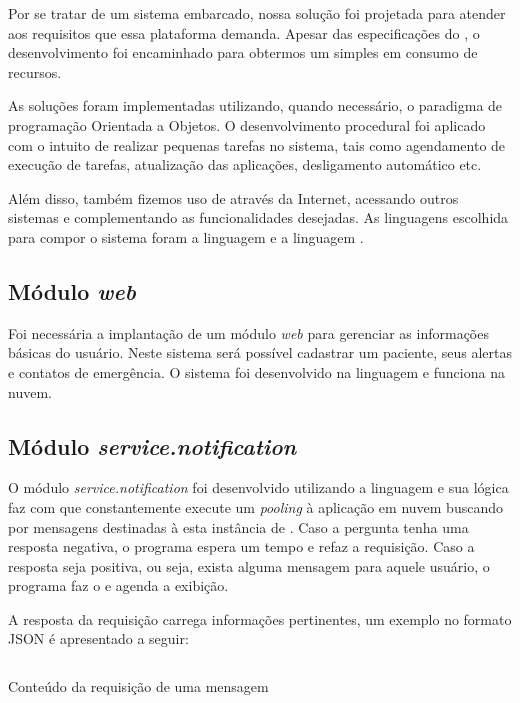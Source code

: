 Por se tratar de um sistema embarcado, nossa solução foi projetada para atender
aos requisitos que essa plataforma demanda. Apesar das especificações do 
\hardware[], o desenvolvimento foi encaminhado para obtermos um \software[] 
simples em consumo de recursos.

As soluções foram implementadas utilizando, quando necessário, o paradigma
de programação Orientada a Objetos. O desenvolvimento procedural foi aplicado
com o intuito de realizar pequenas tarefas no sistema, tais como agendamento
de execução de tarefas, atualização das aplicações, desligamento automático etc.

Além disso, também fizemos uso de \webservices[] através da Internet, acessando
outros sistemas e complementando as funcionalidades desejadas.
As linguagens escolhida para compor o sistema foram a linguagem \python[] e a
linguagem \shell[]. 

\subsection{Módulo \textit{web}}

Foi necessária a implantação de um módulo \textit{web} para gerenciar as 
informações básicas do usuário. Neste sistema será possível cadastrar um 
paciente, seus alertas e contatos de emergência. O sistema foi desenvolvido
na linguagem \python[] e funciona na nuvem.

\subsection{Módulo \textit{service.notification}} 

O módulo \textit{service.notification} foi desenvolvido utilizando a linguagem
\python[] e sua lógica faz com que constantemente execute um \textit{pooling} 
à aplicação em nuvem buscando por mensagens destinadas à esta instância de 
\software. Caso a pergunta tenha uma resposta negativa, o programa espera um 
tempo e refaz a requisição. Caso a resposta seja positiva, ou seja, exista 
alguma mensagem para aquele usuário, o programa faz o \download[] e agenda a
exibição. 

A resposta da requisição carrega informações pertinentes, um exemplo no formato
JSON é apresentado a seguir:

\begin{listing}[ht!]
\inputminted{json}{codigos/message.json}
\caption{Conteúdo da requisição de uma mensagem}
\label{lst:notification-json}
\end{listing}

